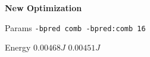 
        \begin{tcolorbox}[width=\linewidth, colback=white!95!black, colframe=white!95!black]
            \begin{center}\textbf{New Optimization}\end{center}

            \tcblower
            
            Params \hfill \verb|-bpred comb -bpred:comb 16|

            Energy \hfill \st{$0.00468J$} $0.00451J$

        \end{tcolorbox}
    